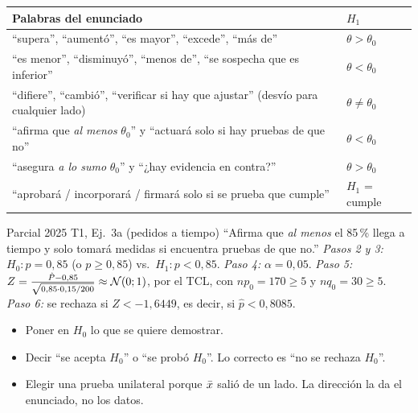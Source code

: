 \begin{center}
\small
\renewcommand{\arraystretch}{1.25}
\begin{tabular}{@{}>{\raggedright\arraybackslash}p{9cm}l@{}}
\toprule
Palabras del enunciado & $H_1$\\\midrule
``supera'', ``aumentó'', ``es mayor'', ``excede'', ``más de'' & $\theta>\theta_0$\\
``es menor'', ``disminuyó'', ``menos de'', ``se sospecha que es inferior'' & $\theta<\theta_0$\\
``difiere'', ``cambió'', ``verificar si hay que ajustar'' (desvío para cualquier lado) & $\theta\neq\theta_0$\\
``afirma que \emph{al menos} $\theta_0$'' y ``actuará solo si hay pruebas de que no'' & $\theta<\theta_0$\\
``asegura \emph{a lo sumo} $\theta_0$'' y ``¿hay evidencia en contra?'' & $\theta>\theta_0$\\
``aprobará / incorporará / firmará solo si se prueba que cumple'' & $H_1$ = cumple\\
\bottomrule
\end{tabular}
\end{center}
\begin{modelo}{Parcial 2025 T1, Ej.\ 3a (pedidos a tiempo)}
``Afirma que \emph{al menos} el 85\,\% llega a tiempo y solo tomará medidas si encuentra pruebas de que no.''
\emph{Pasos 2 y 3:} $H_0:p=0{,}85$ (o $p\ge0{,}85$) vs.\ $H_1:p<0{,}85$. \emph{Paso 4:} $\alpha=0{,}05$.
\emph{Paso 5:} $Z=\frac{\hat P-0{,}85}{\sqrt{0{,}85\cdot0{,}15/200}}\approx\mathcal{N}(0;1)$, por el TCL, con $np_0=170\ge5$ y $nq_0=30\ge5$.
\emph{Paso 6:} se rechaza si $Z<-1{,}6449$, es decir, si $\hat p<0{,}8085$.
\end{modelo}
\begin{ojo}
\begin{itemize}
\item Poner en $H_0$ lo que se quiere demostrar.
\item Decir ``se acepta $H_0$'' o ``se probó $H_0$''. Lo correcto es ``no se rechaza $H_0$''.
\item Elegir una prueba unilateral porque $\bar{x}$ salió de un lado. La dirección la da el enunciado, no los datos.
\end{itemize}
\end{ojo}

